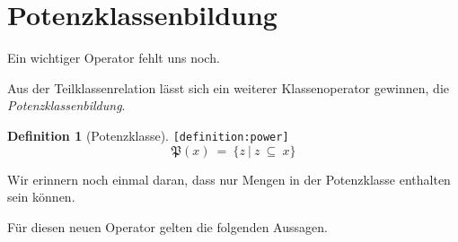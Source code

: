 \documentclass[a4paper,german,10pt,twoside]{book}
\theoremstyle{definition}
\newtheorem{defn}{Definition}
\theoremstyle{remark}
\begin{document}
\section{Potenzklassenbildung} \label{chapter4_section6} \hypertarget{chapter4_section6}{}
Ein wichtiger Operator fehlt uns noch.

\par
Aus der Teilklassenrelation l{\"a}sst sich ein weiterer Klassenoperator gewinnen, die \emph{Potenzklassenbildung}.

\begin{defn}[Potenzklasse]
\label{definition:power} \hypertarget{definition:power}{}
{\tt \tiny [\verb]definition:power]]}
$$\mathfrak{P}(x) \ = \ \{ z \ | \ z \ \subseteq \ x \} $$
\end{defn}

Wir erinnern noch einmal daran, dass nur Mengen in der Potenzklasse enthalten sein k{\"o}nnen.


\par
F{\"u}r diesen neuen Operator gelten die folgenden Aussagen.
\end{document}
